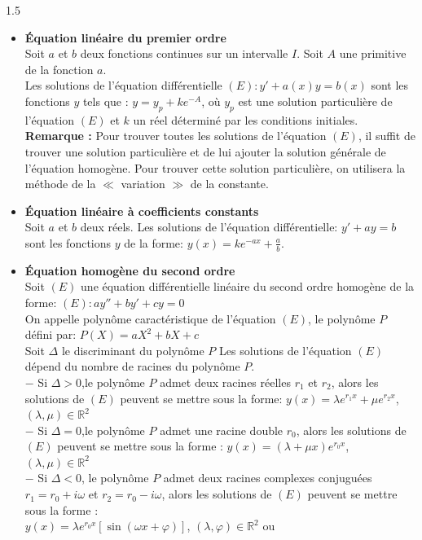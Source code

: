 \documentclass[12pt]{article}
\begin{document}
\begin{spacing}{1.5}
\begin{itemize}
 \item \quad \textbf{Équation linéaire du premier ordre}\\
  Soit $a$ et $b$ deux fonctions continues sur un intervalle $I$. Soit $A$ une primitive de la
 fonction $a$.\\
 Les solutions de l'équation différentielle $(E) : y' + a(x)y = b(x)$ sont les fonctions $y$ tels que : $y = y_p + ke^{-A}$, où $y_p$ est une solution particulière de l'équation $(E)$ et $k$ un réel déterminé par les conditions initiales.\\
\textbf{Remarque :} Pour trouver toutes les solutions de l'équation $(E)$, il suffit de trouver une solution particulière et de lui ajouter la solution générale de l'équation homogène. Pour trouver cette solution particulière, on utilisera la méthode de la $\ll$ variation $\gg$ de la constante.\\
\item \quad \textbf{ Équation linéaire à coefficients constants}\\
 Soit $a$ et $b$ deux réels. Les solutions de l'équation différentielle: $y'+ay=b$ sont les fonctions $y$ de la forme:
 $y(x)=ke^{-ax}+\frac{a}{b}$.
\item \quad \textbf{Équation homogène du second ordre}\\ 
 Soit $(E)$ une équation différentielle linéaire du second ordre
 homogène de la forme: $(E) : ay''+by'+cy=0$\\
 On appelle polynôme caractéristique de l'équation $(E)$, le polynôme $P$ défini
 par: $P(X)=aX^2+bX+c$\\
 Soit $\Delta$ le discriminant du polynôme $P$
 Les solutions de l'équation $(E)$ dépend du nombre de racines du polynôme $P$.\\
 $-$ Si $\Delta>0$,le polynôme $P$ admet deux racines réelles $r_1$ et $r_2$, alors les solutions de $(E)$ peuvent se mettre sous la forme:
 $y(x)=\lambda e^{r_1x}+\mu e^{r_2x}$, $(\lambda,\mu)\in \mathbb{R}^2$\\
$-$ Si $\Delta=0$,le polynôme $P$ admet une racine double $r_0$, alors les solutions de
 $(E)$ peuvent se mettre sous la forme : 
 $y(x)=(\lambda+\mu x)e^{r_0x}$,  $(\lambda,\mu)\in \mathbb{R}^2$\\
 $-$ Si $\Delta<0$, le polynôme $P$ admet deux racines complexes conjuguées $r_1=r_0+i\omega$ et $r_2=r_0-i\omega$, alors les solutions de $(E)$ peuvent se mettre sous la forme : \\
 $y(x)=\lambda e^{r_0x}\left[\sin(\omega x+\varphi)\right]$, $(\lambda,\varphi)\in \mathbb{R}^2$ ou\\

\end{itemize}
\end{spacing}
\end{document}

